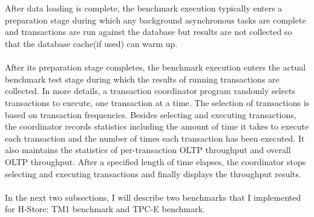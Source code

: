 \documentclass[a4paper,10pt]{article}
\begin{document}
\\\\
After data loading is complete, the benchmark execution typically enters a preparation stage during which any background asynchronous tasks are complete and transactions are run against the database but results are not collected so that the database cache(if used) can warm up.   
\\\\
After its preparation stage completes, the benchmark execution enters the actual benchmark test stage during which the results of running transactions are collected. In more details, a transaction coordinator program randomly selects transactions to execute, one transaction at a time. The selection of transactions is based on transaction frequencies. Besides selecting and executing transactions, the coordinator records statistics including the amount of time it takes to execute each transaction and the number of times each transaction has been executed. It also maintains the statistics of per-transaction OLTP throughput and overall OLTP throughput. After a specified length of time elapses, the coordinator stops selecting and executing transactions and finally displays the throughput results. 
\\\\
In the next two subsections, I will describe two benchmarks that I implemented for H-Store: TM1 benchmark and TPC-E benchmark.
\end{document}
